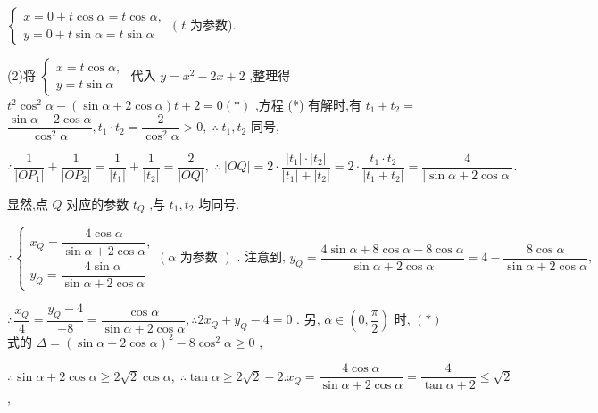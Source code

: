 $\left\{  {\begin{array}{l} x = 0 + t\cos \alpha  = t\cos \alpha , \\  y = 0 + t\sin \alpha  = t\sin \alpha  \end{array}\text{ ( }t}\right.$ 为参数).

(2)将 $\left\{  \begin{array}{l} x = t\cos \alpha , \\  y = t\sin \alpha  \end{array}\right.$ 代入 $y = {x}^{2} - {2x} + 2$ ,整理得 ${t}^{2}{\cos }^{2}\alpha  - \left( {\sin \alpha  + 2\cos \alpha }\right) t + 2 = 0\left( *\right)$ ,方程 (*) 有解时,有 ${t}_{1} + {t}_{2} =$  $\dfrac{\sin \alpha  + 2\cos \alpha }{{\cos }^{2}\alpha },{t}_{1} \cdot  {t}_{2} = \dfrac{2}{{\cos }^{2}\alpha } > 0,\;\therefore \;{t}_{1},{t}_{2}$ 同号,

$\therefore \dfrac{1}{\left| O{P}_{1}\right| } + \dfrac{1}{\left| O{P}_{2}\right| } = \dfrac{1}{\left| {t}_{1}\right| } + \dfrac{1}{\left| {t}_{2}\right| } = \dfrac{2}{\left| OQ\right| },\;\therefore \;\left| {OQ}\right|  = 2 \cdot  \dfrac{\left| {t}_{1}\right|  \cdot  \left| {t}_{2}\right| }{\left| {t}_{1}\right|  + \left| {t}_{2}\right| } = 2 \cdot  \dfrac{{t}_{1} \cdot  {t}_{2}}{\left| {t}_{1} + {t}_{2}\right| } = \dfrac{4}{\left| \sin \alpha  + 2\cos \alpha \right| }.$

显然,点 $Q$ 对应的参数 ${t}_{Q}$ ,与 ${t}_{1},{t}_{2}$ 均同号.

$\therefore \left\{  {\begin{array}{l} {x}_{Q} = \dfrac{4\cos \alpha }{\sin \alpha  + 2\cos \alpha }, \\  {y}_{Q} = \dfrac{4\sin \alpha }{\sin \alpha  + 2\cos \alpha } \end{array}\left( {\alpha \text{ 为参数 }}\right) \text{ . 注意到, }{y}_{Q} = \dfrac{4\sin \alpha  + 8\cos \alpha  - 8\cos \alpha }{\sin \alpha  + 2\cos \alpha } = 4 - \dfrac{8\cos \alpha }{\sin \alpha  + 2\cos \alpha },}\right.$

$\therefore \dfrac{{x}_{Q}}{4} = \dfrac{{y}_{Q} - 4}{-8} = \dfrac{\cos \alpha }{\sin \alpha  + 2\cos \alpha },\therefore 2{x}_{Q} + {y}_{Q} - 4 = 0$ . 另, $\alpha  \in  \left( {0,\dfrac{\pi }{2}}\right)$ 时, $\left( *\right)$ 式的 $\Delta  = {\left( \sin \alpha  + 2\cos \alpha \right) }^{2} - 8{\cos }^{2}\alpha  \geq  0$ ,

$\therefore \sin \alpha  + 2\cos \alpha  \geq  2\sqrt{2}\cos \alpha ,\;\therefore \tan \alpha  \geq  2\sqrt{2} - 2.{x}_{Q} = \dfrac{4\cos \alpha }{\sin \alpha  + 2\cos \alpha } = \dfrac{4}{\tan \alpha  + 2} \leq  \sqrt{2}$ ,

